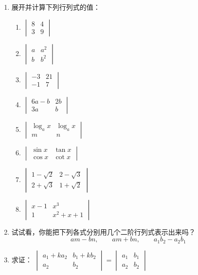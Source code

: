 \begin{ex}
\begin{enumerate}
    \item 展开并计算下列行列式的值：
\begin{multicols}{2}
\begin{enumerate}
    \item $\begin{vmatrix}
    8&4\\3&9
\end{vmatrix}$
    \item $\begin{vmatrix}
    a&a^2\\b&b^2
\end{vmatrix}$
\item $\begin{vmatrix}
    -3&21\\-1&7
\end{vmatrix}$
\item $\begin{vmatrix}
    6a-b&2b\\3a&b
\end{vmatrix}$
\item $\begin{vmatrix}
    \log_a x&\log_a x\\m&n
\end{vmatrix}$
\item $\begin{vmatrix}
    \sin x&\tan x\\ \cos x&\cot x
\end{vmatrix}$
\item $\begin{vmatrix}
     1-\sqrt{2}&2-\sqrt{3}\\2+\sqrt{3}&1+\sqrt{2}
\end{vmatrix}$
\item $\begin{vmatrix}
     x-1&x^3\\1&x^2+x+1
\end{vmatrix}$
\end{enumerate}
\end{multicols}

    \item 试试看，你能把下列各式分别用几个二阶行列式表示出来吗？
    \[am-bn,\qquad am+bn,\qquad a_1b_2-a_2b_1\]
    \item 求证：
    $\begin{vmatrix}
        a_1+ka_2 &b_1+kb_2 \\ a_2&b_2
    \end{vmatrix}=\begin{vmatrix}
        a_1  &b_1  \\ a_2&b_2
    \end{vmatrix}$
\end{enumerate}
\end{ex}

